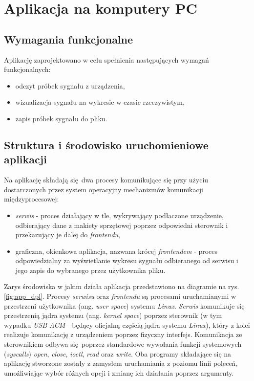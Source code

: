 
\chapter{Aplikacja na komputery PC}

\section{Wymagania funkcjonalne}

Aplikację zaprojektowano w celu spełnienia następujących wymagań funkcjonalnych:

\begin{itemize}
    \item odczyt próbek sygnału z urządzenia,
    \item wizualizacja sygnału na wykresie w czasie rzeczywistym,
    \item zapis próbek sygnału do pliku.
\end{itemize}


\section{Struktura i środowisko uruchomieniowe aplikacji}

Na aplikację składają się dwa procesy komunikujące się przy użyciu dostarczonych przez system
operacyjny mechanizmów komunikacji międzyprocesowej:

\begin{itemize}
    \item \textit{serwis} - proces działający w tle, wykrywający podłaczone urządzenie, 
    odbierający dane z makiety sprzętowej poprzez odpowiedni sterownik i przekazujący je 
    dalej do \textit{frontendu},

    \item graficzna, okienkowa aplikacja, nazwana krócej \textit{frontendem} - 
     proces odpowiedzialny za wyświetlanie wykresu sygnału odbieranego
    od serwisu i jego zapis do wybranego przez użytkownika pliku.
\end{itemize}

Zarys środowiska w jakim działa aplikacja przedstawiono na diagramie na rys. \ref{fig:app_dpl}.
Procesy \textit{serwisu} oraz \textit{frontendu} są procesami uruchamianymi w przestrzeni użytkownika
(ang. \textit{user space}) systemu \textit{Linux}. \textit{Serwis} komunikuje się przestrzenią 
jądra systemu (ang. \textit{kernel space}) poprzez sterownik 
(w tym wypadku \textit{USB ACM} - będący oficjalną częścią jądra systemu \textit{Linux}), 
który z kolei realizuje komunikację z urządzeniem poprzez fizyczny interfejs. 
Komunikacja ze sterownikiem odbywa się poprzez standardowe wywołania funkcji systemowych (\textit{syscalls}) 
\textit{open}, \textit{close}, \textit{ioctl}, \textit{read} oraz \textit{write}.
Oba programy składające się na aplikację stworzone zostały z zamysłem uruchamiania z poziomu linii poleceń,
umożliwiając wybór różnych opcji i zmianę ich działania poprzez argumenty.

